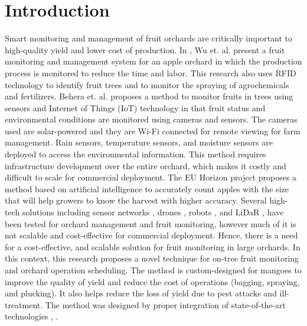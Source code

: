 \documentclass[journal]{IEEEtran}
\begin{document}
\section{Introduction}
Smart monitoring and management of fruit orchards are critically important to high-quality yield and lower cost of production. In \cite{apple}, Wu et. al. present a fruit monitoring and management system for an apple orchard in which the production process is monitored to reduce the time and labor. This research also uses RFID technology \cite{RFID} to identify fruit trees and to monitor the spraying of agrochemicals and fertilizers. Behera et. al. \cite{behera2021tree} proposes a method to monitor fruits in trees using sensors and  Internet of Things (IoT) technology in that fruit status and environmental conditions are monitored using cameras and sensors. The cameras used are solar-powered and they are Wi-Fi connected for remote viewing for farm management. Rain sensors, temperature sensors, and moisture sensors are deployed to access the environmental information. This method requires infrastructure development over the entire orchard, which makes it costly and difficult to scale for commercial deployment. The EU Horizon project \cite{EU2020} proposes a method based on artificial intelligence to accurately count apples with the size that will help growers to know the harvest with higher accuracy. Several high-tech solutions including sensor networks \cite{Yuan}, drones \cite{Suryawansi}, robots \cite{Mengoli}, and LiDaR \cite{Tsoulias}, have been tested for orchard management and fruit monitoring, however much of it is not scalable and cost-effective for commercial deployment. Hence, there is a need for a cost-effective, and scalable solution for fruit monitoring in large orchards. In this context, this research proposes a novel technique for on-tree fruit monitoring and orchard operation scheduling. The method is custom-designed for mangoes to improve the quality of yield and reduce the cost of operations (bagging, spraying, and plucking). It also helps reduce the loss of yield due to pest attacks and ill-treatment. The method was designed by proper integration of state-of-the-art technologies \cite{Ruiz}, \cite{architecture}.\par
\end{document}

